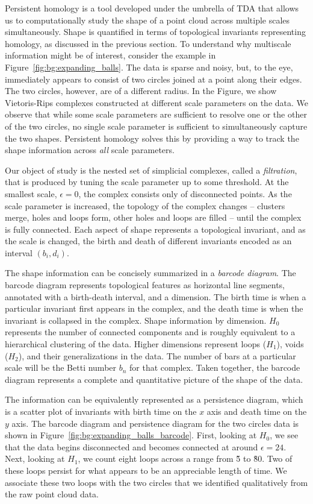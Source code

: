Persistent homology is a tool developed under the umbrella of TDA that allows us to computationally study the shape of a point cloud across multiple scales simultaneously.
Shape is quantified in terms of topological invariants representing homology, as discussed in the previous section.
To understand why multiscale information might be of interest, consider the example in Figure~\ref{fig:bg:expanding_balls}.
The data is sparse and noisy, but, to the eye, immediately appears to consist of two circles joined at a point along their edges.
The two circles, however, are of a different radius.
In the Figure, we show Vietoris-Rips complexes constructed at different scale parameters on the data.
We observe that while some scale parameters are sufficient to resolve one or the other of the two circles, no single scale parameter is sufficient to simultaneously capture the two shapes.
Persistent homology solves this by providing a way to track the shape information across \emph{all} scale parameters.

Our object of study is the nested set of simplicial complexes, called a \emph{filtration}, that is produced by tuning the scale parameter up to some threshold.
At the smallest scale, $\epsilon=0$, the complex consists only of disconnected points.
As the scale parameter is increased, the topology of the complex changes -- clusters merge, holes and loops form, other holes and loops are filled -- until the complex is fully connected.
Each aspect of shape represents a topological invariant, and as the scale is changed, the birth and death of different invariants encoded as an interval $(b_i, d_i)$.

The shape information can be concisely summarized in a \emph{barcode diagram}.
The barcode diagram represents topological features as horizontal line segments, annotated with a birth-death interval, and a dimension.
The birth time is when a particular invariant first appears in the complex, and the death time is when the invariant is collapsed in the complex.
Shape information by dimension.
$H_0$ represents the number of connected components and is roughly equivalent to a hierarchical clustering of the data.
Higher dimensions represent loops ($H_1$), voids ($H_2$), and their generalizations in the data.
The number of bars at a particular scale will be the Betti number $b_n$ for that complex.
Taken together, the barcode diagram represents a complete and quantitative picture of the shape of the data.

The information can be equivalently represented as a persistence diagram, which is a scatter plot of invariants with birth time on the $x$ axis and death time on the $y$ axis.
The barcode diagram and persistence diagram for the two circles data is shown in Figure~\ref{fig:bg:expanding_balls_barcode}.
First, looking at $H_0$, we see that the data begins disconnected and becomes connected at around $\epsilon=24$.
Next, looking at $H_1$, we count eight loops across a range from \~5 to \~80.
Two of these loops persist for what appears to be an appreciable length of time.
We associate these two loops with the two circles that we identified qualitatively from the raw point cloud data.

